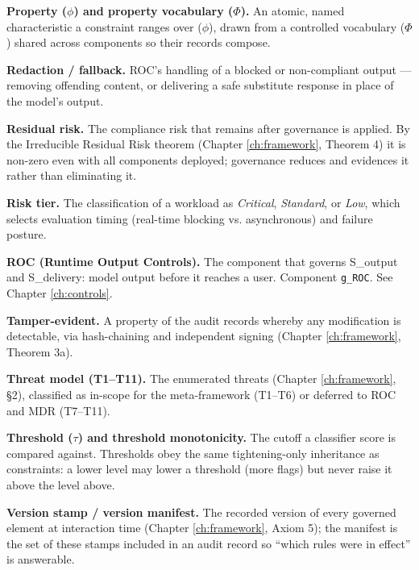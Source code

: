 \textbf{Property ($\phi$) and property vocabulary ($\Phi$).} An atomic, named characteristic a
constraint ranges over ($\phi$), drawn from a controlled vocabulary ($\Phi$) shared across
components so their records compose.

\textbf{Redaction / fallback.} ROC's handling of a blocked or non-compliant output ---
removing offending content, or delivering a safe substitute response in place of
the model's output.

\textbf{Residual risk.} The compliance risk that remains after governance is applied.
By the Irreducible Residual Risk theorem (Chapter \ref{ch:framework}, Theorem 4) it is non-zero
even with all components deployed; governance reduces and evidences it rather than
eliminating it.

\textbf{Risk tier.} The classification of a workload as \emph{Critical}, \emph{Standard}, or
\emph{Low}, which selects evaluation timing (real-time blocking vs. asynchronous) and
failure posture.

\textbf{ROC (Runtime Output Controls).} The component that governs S\_\allowbreak{}output and
S\_\allowbreak{}delivery: model output before it reaches a user. Component \texttt{g\_\allowbreak{}ROC}. See
Chapter \ref{ch:controls}.

\textbf{Tamper-evident.} A property of the audit records whereby any modification is
detectable, via hash-chaining and independent signing (Chapter \ref{ch:framework}, Theorem 3a).

\textbf{Threat model (T1--T11).} The enumerated threats (Chapter \ref{ch:framework}, \S{}2), classified as
in-scope for the meta-framework (T1--T6) or deferred to ROC and MDR (T7--T11).

\textbf{Threshold ($\tau$) and threshold monotonicity.} The cutoff a classifier score is
compared against. Thresholds obey the same tightening-only inheritance as
constraints: a lower level may lower a threshold (more flags) but never raise it
above the level above.

\textbf{Version stamp / version manifest.} The recorded version of every governed
element at interaction time (Chapter \ref{ch:framework}, Axiom 5); the manifest is the set of these
stamps included in an audit record so ``which rules were in effect'' is answerable.

